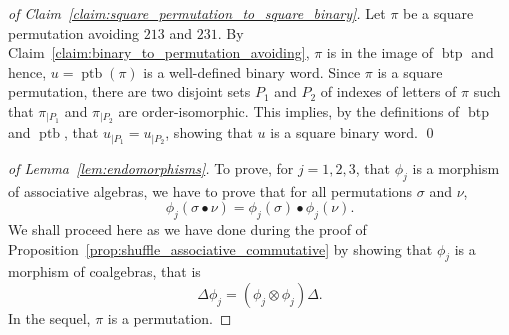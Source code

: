 \documentclass[a4paper]{llncs}
\DeclareMathOperator{\SHUFFLE}{\bullet}
\DeclareMathOperator{\BINTOPERM}{\mathrm{btp}}
\DeclareMathOperator{\PERMTOBIN}{\mathrm{ptb}}
\begin{document}
\begin{proof}[of Claim~\ref{claim:square_permutation_to_square_binary}]
    Let $\pi$ be a square permutation avoiding $213$ and $231$. By
    Claim~\ref{claim:binary_to_permutation_avoiding}, $\pi$ is in
    the image of $\BINTOPERM$ and hence, $u = \PERMTOBIN(\pi)$ is a
    well-defined binary word. Since $\pi$ is a square permutation,
    there are two disjoint sets $P_1$ and $P_2$ of indexes of letters
    of $\pi$ such that $\pi_{|P_1}$ and $\pi_{|P_2}$ are
    order-isomorphic. This implies, by the definitions of $\BINTOPERM$
    and $\PERMTOBIN$, that $u_{|P_1} = u_{|P_2}$, showing that $u$
    is a square binary word.
    \qed
\end{proof}
\bigskip

\begin{proof}[of Lemma~\ref{lem:endomorphisms}]
    To prove, for $j = 1, 2, 3$, that $\phi_j$ is a morphism of
    associative algebras, we have to prove that for all permutations
    $\sigma$ and $\nu$,
    \begin{equation}
        \phi_j(\sigma \SHUFFLE \nu) =
        \phi_j(\sigma) \SHUFFLE \phi_j(\nu).
    \end{equation}
    We shall proceed here as we have done during the proof of
    Proposition~\ref{prop:shuffle_associative_commutative} by showing
    that $\phi_j$ is a morphism of coalgebras, that is
    \begin{equation}
        \Delta \phi_j = (\phi_j \otimes \phi_j) \Delta.
    \end{equation}
    In the sequel, $\pi$ is a permutation.
    \smallskip


\end{proof}
\end{document}
